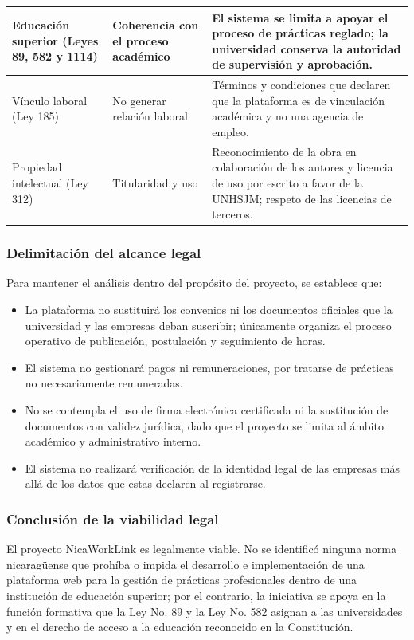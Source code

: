 \begin{longtable}{@{}>{\raggedright\arraybackslash}p{3.4cm}>{\raggedright\arraybackslash}p{3.4cm}>{\raggedright\arraybackslash}p{7.2cm}@{}}
Educación superior (Leyes 89, 582 y 1114) & Coherencia con el proceso académico & El sistema se limita a apoyar el proceso de prácticas reglado; la universidad conserva la autoridad de supervisión y aprobación. \\
\hline
Vínculo laboral (Ley 185) & No generar relación laboral & Términos y condiciones que declaren que la plataforma es de vinculación académica y no una agencia de empleo. \\
\hline
Propiedad intelectual (Ley 312) & Titularidad y uso & Reconocimiento de la obra en colaboración de los autores y licencia de uso por escrito a favor de la UNHSJM; respeto de las licencias de terceros. \\
\end{longtable}

\subsubsection{Delimitación del alcance legal}

Para mantener el análisis dentro del propósito del proyecto, se establece que:

\begin{itemize}
	\item La plataforma no sustituirá los convenios ni los documentos oficiales que la universidad y las empresas deban suscribir; únicamente organiza el proceso operativo de publicación, postulación y seguimiento de horas.
	\item El sistema no gestionará pagos ni remuneraciones, por tratarse de prácticas no necesariamente remuneradas.
	\item No se contempla el uso de firma electrónica certificada ni la sustitución de documentos con validez jurídica, dado que el proyecto se limita al ámbito académico y administrativo interno.
	\item El sistema no realizará verificación de la identidad legal de las empresas más allá de los datos que estas declaren al registrarse.
\end{itemize}

\subsubsection{Conclusión de la viabilidad legal}

El proyecto NicaWorkLink es legalmente viable. No se identificó ninguna norma nicaragüense que prohíba o impida el desarrollo e implementación de una plataforma web para la gestión de prácticas profesionales dentro de una institución de educación superior; por el contrario, la iniciativa se apoya en la función formativa que la Ley No. 89 y la Ley No. 582 asignan a las universidades y en el derecho de acceso a la educación reconocido en la Constitución.

